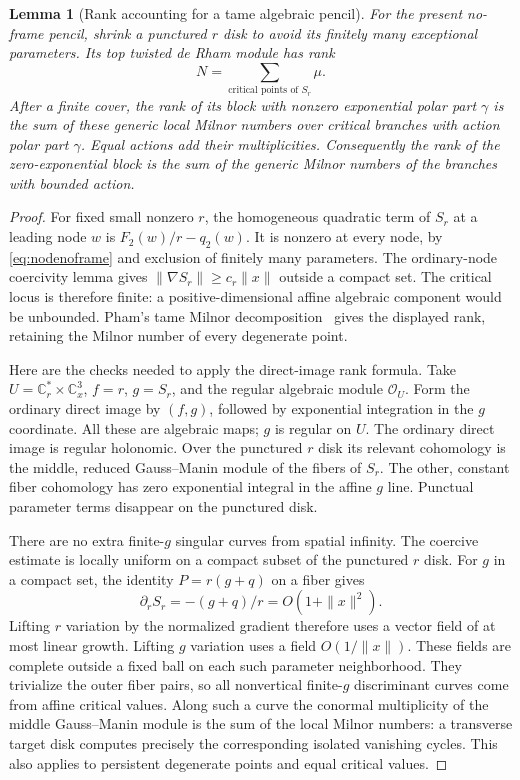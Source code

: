 \documentclass[11pt]{article}
\newtheorem{lemma}[theorem]{Lemma}
\theoremstyle{definition}\newtheorem{definition}[theorem]{Definition}
\theoremstyle{remark}\newtheorem{remark}[theorem]{Remark}
\newcommand{\C}{\mathbb C}
\begin{document}
\begin{lemma}[Rank accounting for a tame algebraic pencil]
\label{lem:tamepencilrank}
For the present no-frame pencil, shrink a punctured $r$ disk to
avoid its finitely many exceptional parameters. Its top twisted
de Rham module has rank
\[
 N=\sum_{\text{critical points of }S_r}\mu.
\]
After a finite cover, the rank of its block with nonzero
exponential polar part $\gamma$ is the sum of these generic local
Milnor numbers over critical branches with action polar part
$\gamma$. Equal actions add their multiplicities. Consequently
the rank of the zero-exponential block is the sum of the generic
Milnor numbers of the branches with bounded action.
\end{lemma}
\begin{proof}
For fixed small nonzero $r$, the homogeneous quadratic term of
$S_r$ at a leading node $w$ is $F_2(w)/r-q_2(w)$. It is nonzero
at every node, by \eqref{eq:nodenoframe} and exclusion of finitely
many parameters. The ordinary-node coercivity lemma gives
$\|\nabla S_r\|\ge c_r\|x\|$ outside a compact set. The
critical locus is therefore finite: a positive-dimensional affine
algebraic component would be unbounded. Pham's tame Milnor
decomposition~\cite[Part~I, Sections~1--4]{Pham} gives the displayed
rank, retaining the Milnor number of every degenerate point.

Here are the checks needed to apply the direct-image rank formula.
Take $U=\C_r^*\times\C_x^3$, $f=r$, $g=S_r$, and the regular
algebraic module $\mathcal O_U$. Form the ordinary direct image
by $(f,g)$, followed by exponential integration in the $g$
coordinate. All these are algebraic maps; $g$ is regular on $U$.
The ordinary direct image is regular holonomic. Over the punctured
$r$ disk its relevant cohomology is the middle, reduced
Gauss--Manin module of the fibers of $S_r$. The other, constant
fiber cohomology has zero exponential integral in the affine $g$
line. Punctual parameter terms disappear on the punctured disk.

There are no extra finite-$g$ singular curves from spatial infinity.
The coercive estimate is locally uniform on a compact subset of
the punctured $r$ disk. For $g$ in a compact set, the identity
$P=r(g+q)$ on a fiber gives
\[
 \partial_r S_r=-(g+q)/r=O(1+\|x\|^2).
\]
Lifting $r$ variation by the normalized gradient therefore uses a
vector field of at most linear growth. Lifting $g$ variation uses
a field $O(1/\|x\|)$. These fields are complete outside a fixed
ball on each such parameter neighborhood. They trivialize the
outer fiber pairs, so all nonvertical finite-$g$ discriminant
curves come from affine critical values. Along such a curve the
conormal multiplicity of the middle Gauss--Manin module is the
sum of the local Milnor numbers: a transverse target disk computes
precisely the corresponding isolated vanishing cycles. This also
applies to persistent degenerate points and equal critical values.


\end{proof}
\end{document}
